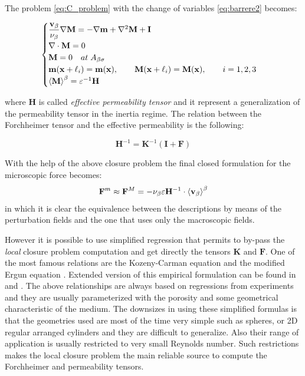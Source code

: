 The problem \eqref{eq:C_problem} with the change of variables \eqref{eq:barrere2} becomes:

\begin{eqnarray}
	\begin{cases}
		\dfrac{\textbf{v}_{\beta}}{\nu_{\beta}} \nabla \mathbf{M} = -\nabla \mathbf{m} + \nabla^2 \mathbf{M} +\mathbf{I}\\
		\nabla \cdot \mathbf{M} = 0  \\
		\mathbf{M} = 0 \quad at \; A_{\beta \sigma} \\
		\mathbf{m}(\mathbf{x} +\ell_i) = \mathbf{m}(\mathbf{x}), \qquad \mathbf{M}(\mathbf{x} +\ell_i) = \mathbf{M}(\mathbf{x}), \qquad i=1,2,3 \\
		{\left< \mathbf{M} \right>}^{\beta} = \varepsilon^{-1} \mathbf{H}
	\end{cases}
\label{eq:M_problem}
\end{eqnarray}

where $\mathbf{H}$ is called \textit{effective permeability tensor} and it represent a generalization of the permeability tensor in the inertia regime.
The relation between the Forchheimer tensor and the effective permeability is the following:

$$
\mathbf{H}^{-1} = \mathbf{K}^{-1} \left(\mathbf{I} +\mathbf{F}\right)
$$

With the help of the above closure problem the final closed formulation for the microscopic force becomes:
\begin{equation}
\mathbf{F}^m \approx \mathbf{F}^M = - \nu_{\beta} \varepsilon \mathbf{H}^{-1} \cdot {\left< \textbf{v}_{\beta}\right>}^{\beta}
\label{eq:closure_final}
\end{equation}
in which it is clear the equivalence between the descriptions by means of the perturbation fields and the one that uses only the macroscopic fields.


However it is possible to use simplified regression that permits to by-pass the \textit{local} closure problem computation and get directly the tensors $\mathbf{K}$ and $\mathbf{F}$.
One of the most famous relations are the Kozeny-Carman equation \citet{kozeny} and the modified Ergun equation \citet{transport2002bird}.
Extended version of this empirical formulation can be found in \citet{zampogna2016fluid} and \citet{yazdchi2012towards}.
The above relationships are always based on regressions from experiments and they are usually parameterized with the porosity and some geometrical characteristic of the medium. The downsizes in using these simplified formulas is that the geometries used are most of the time very simple such as spheres, or 2D regular arranged cylinders and they are difficult to generalize. Also their range of application is usually restricted to very small Reynolds number. Such restrictions makes the local closure problem the main reliable source to compute the Forchheimer and permeability tensors.

